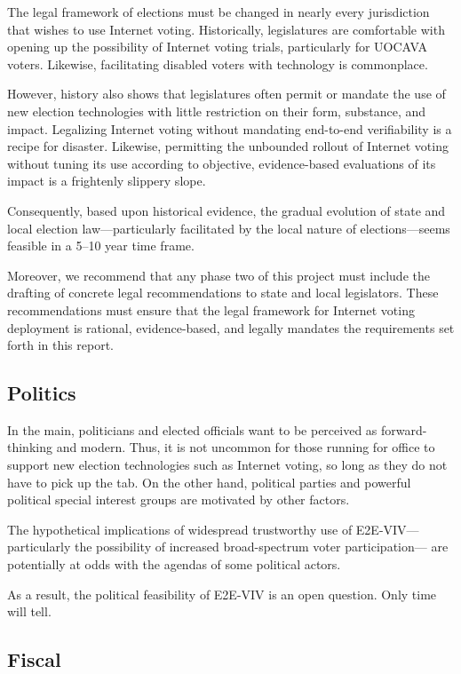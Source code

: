 The legal framework of elections must be changed in nearly every
jurisdiction that wishes to use Internet voting.  Historically,
legislatures are comfortable with opening up the possibility of
Internet voting trials, particularly for UOCAVA voters.  Likewise,
facilitating disabled voters with technology is commonplace.

However, history also shows that legislatures often permit or mandate
the use of new election technologies with little restriction on their
form, substance, and impact.  Legalizing Internet voting without
mandating end-to-end verifiability is a recipe for disaster.
Likewise, permitting the unbounded rollout of Internet voting without
tuning its use according to objective, evidence-based evaluations of
its impact is a frightenly slippery slope.

Consequently, based upon historical evidence, the gradual evolution of
state and local election law---particularly facilitated by the local
nature of elections---seems feasible in a 5--10 year time frame.

Moreover, we recommend that any phase two of this project must include
the drafting of concrete legal recommendations to state and local
legislators.  These recommendations must ensure that the legal
framework for Internet voting deployment is rational, evidence-based,
and legally mandates the requirements set forth in this report.

\subsection{Politics}

In the main, politicians and elected officials want to be perceived as
forward-thinking and modern.  Thus, it is not uncommon for those
running for office to support new election technologies such as
Internet voting, so long as they do not have to pick up the tab.  On
the other hand, political parties and powerful political special
interest groups are motivated by other factors.

The hypothetical implications of widespread trustworthy use of
E2E-VIV---particularly the possibility of increased broad-spectrum
voter participation--- are potentially at odds with the agendas of
some political actors.

As a result, the political feasibility of E2E-VIV is an open question.
Only time will tell.

\subsection{Fiscal}
\label{sec:fiscal}

